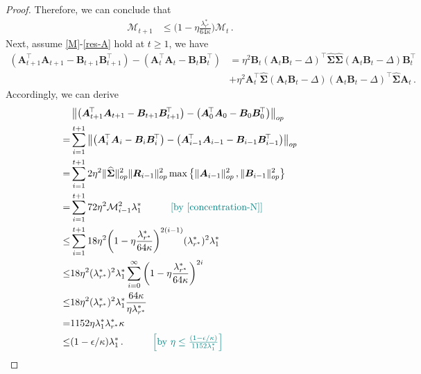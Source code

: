 \begin{proof}
    Therefore, we can conclude that
    \begin{align*}
        \mathcal{M}_{t+1} & \leq \bigg(1-\eta \frac{\lambda^*_{r^*}}{64\kappa}\bigg)\mathcal{M}_t\,.
    \end{align*}
    Next, assume \cref{M}-\cref{res-A} hold at $t\geq 1$, we have
    \begin{align*}
        \left(\bm A_{t+1}^{\!\top}\bm A_{t+1} - \bm B_{t+1}\bm B_{t+1}^{\!\top}\right)-\left(\bm A_{t}^{\!\top}\bm A_{t} - \bm B_{t}\bm B_{t}^{\!\top}\right) & = \eta^2 \bm B_t\left(\bm A_t \bm B_t - \Delta\right)^{\!\top}\widehat{\bm \Sigma}\widehat{\bm \Sigma}\left(\bm A_t \bm B_t - \Delta\right)\bm B_t^{\!\top}\\
        & + \eta^2 \bm A_t^{\!\top}\widehat{\bm \Sigma}\left(\bm A_t \bm B_t - \Delta\right)\left(\bm A_t \bm B_t - \Delta\right)^{\!\top}\widehat{\bm \Sigma}\bm A_t\,.
    \end{align*}
    Accordingly, we can derive
    \begin{align*}
        &\left\|\left(\bm A_{t+1}^{\!\top}\bm A_{t+1} - \bm B_{t+1}\bm B_{t+1}^{\!\top}\right)-\left(\bm A_{0}^{\!\top}\bm A_{0} - \bm B_{0}\bm B_{0}^{\!\top}\right)\right\|_{op}\\
        =&\sum_{i=1}^{t+1}\left\|\left(\bm A_{i}^{\!\top}\bm A_{i} - \bm B_{i}\bm B_{i}^{\!\top}\right)-\left(\bm A_{i-1}^{\!\top}\bm A_{i-1} - \bm B_{i-1}\bm B_{i-1}^{\!\top}\right)\right\|_{op}\\
        =&\sum_{i=1}^{t+1}2\eta^2 \|\widehat{\bm \Sigma}\|_{op}^2 \|\bm R_{i-1}\|_{op}^2 \max\left\{\|\bm A_{i-1}\|_{op}^2\,, \|\bm B_{i-1}\|_{op}^2\right\}\\
        =&\sum_{i=1}^{t+1}72\eta^2 \mathcal{M}_{i-1}^2 \lambda_1^*\quad \tag*{\color{teal}[by \cref{concentration-N}]}\\
        \leq &\sum_{i=1}^{t+1}18\eta^2 \bigg(1-\eta \frac{\lambda^*_{r^*}}{64\kappa}\bigg)^{2(i-1)}(\lambda_{r^*}^*)^2 \lambda_1^*\\
        \leq& 18\eta^2(\lambda_{r^*}^*)^2 \lambda_1^*\sum_{i=0}^{\infty}\bigg(1-\eta \frac{\lambda^*_{r^*}}{64\kappa}\bigg)^{2i}\\
        \leq& 18\eta^2(\lambda_{r^*}^*)^2 \lambda_1^* \frac{64\kappa}{\eta\lambda^*_{r^*}}\\
        =&1152\eta\lambda_1^*\lambda^*_{r^*}\kappa\\
        \leq& (1-\epsilon/\kappa)\lambda_1^*\,. \quad \tag*{\color{teal}$\left[\text{by }\eta\leq\frac{(1-\epsilon/\kappa)}{1152\lambda^*_{1}}\right]$}
    \end{align*}

\end{proof}
